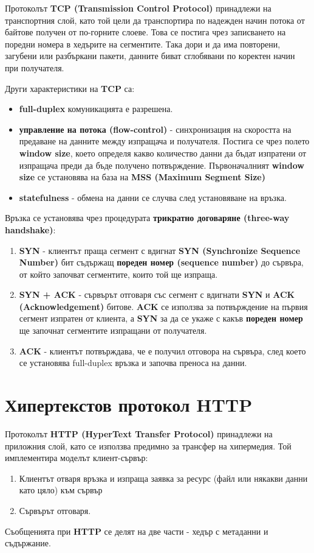 \documentclass[fleqn,12pt]{article}
\begin{document}
Протоколът \textbf{TCP (Transmission Control Protocol)} принадлежи на транспортния слой, като той цели да транспортира по надежден начин потока от байтове получен от по-горните слоеве.
Това се постига чрез записването на поредни номера в хедърите на сегментите. Така дори и да има повторени, загубени или разбъркани пакети, 
данните биват сглобявани по коректен начин при получателя.

Други характеристики на \textbf{TCP} са:
\begin{itemize}
    \item \textbf{full-duplex} комуникацията е разрешена.
    \item \textbf{управление на потока (flow-control)} - синхронизация на скоростта на предаване на данните между изпращача и получателя.
    Постига се чрез полето \textbf{window size}, което определя какво количество данни да бъдат изпратени от изпращача преди да бъде получено потвърждение.
    Първоначалният \textbf{window size} се установява на база на \textbf{MSS (Maximum Segment Size)}
    \item \textbf{statefulness} - обмена на данни се случва след установяване на връзка.
\end{itemize} 

Връзка се установява чрез процедурата \textbf{трикратно договаряне (three-way handshake)}:
\begin{enumerate}
    \item \textbf{SYN} - клиентът праща сегмент с вдигнат \textbf{SYN (Synchronize Sequence Number)} бит съдържащ \textbf{пореден номер (sequence number)} до сървъра, от който започват сегментите, които той ще изпраща.
    \item \textbf{SYN + ACK} - сървърът отговаря със сегмент с вдигнати \textbf{SYN} и \textbf{ACK (Acknowledgement)} битове.
    \textbf{ACK} се използва за потвърждение на първия сегмент изпратен от клиента, а \textbf{SYN} за да се укаже с какъв \textbf{пореден номер} ще започнат сегментите изпращани от получателя.
    \item \textbf{ACK} - клиентът потвърждава, че е получил отговора на сървъра, след което се установява full-duplex връзка и започва преноса на данни.
\end{enumerate}

\section{Хипертекстов протокол HTTP}

Протоколът \textbf{HTTP (HyperText Transfer Protocol)} принадлежи на приложния слой, като се използва предимно за трансфер на хипермедия.
Той имплементира моделът клиент-сървър:
\begin{enumerate}
    \item Клиентът отваря връзка и изпраща заявка за ресурс (файл или някакви данни като цяло) към сървър
    \item Сървърът отговаря.
\end{enumerate}
Съобщенията при \textbf{HTTP} се делят на две части - хедър с метаданни и съдържание.
\end{document}
